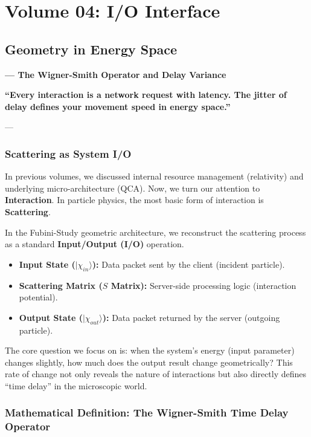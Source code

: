 \documentclass[11pt,a4paper,twoside]{book}
\begin{document}
 
\part{Volume 04: I/O Interface}

\chapter{Geometry in Energy Space}

\textbf{--- The Wigner-Smith Operator and Delay Variance}

\textbf{``Every interaction is a network request with latency. The jitter of delay defines your movement speed in energy space.''}

---

\section{Scattering as System I/O}

In previous volumes, we discussed internal resource management (relativity) and underlying micro-architecture (QCA). Now, we turn our attention to \textbf{Interaction}. In particle physics, the most basic form of interaction is \textbf{Scattering}.

In the Fubini-Study geometric architecture, we reconstruct the scattering process as a standard \textbf{Input/Output (I/O)} operation.

\begin{itemize}
\item \textbf{Input State ($|\chi_{in}\rangle$):} Data packet sent by the client (incident particle).

\item \textbf{Scattering Matrix ($S$ Matrix):} Server-side processing logic (interaction potential).

\item \textbf{Output State ($|\chi_{out}\rangle$):} Data packet returned by the server (outgoing particle).
\end{itemize}

The core question we focus on is: when the system's energy (input parameter) changes slightly, how much does the output result change geometrically? This rate of change not only reveals the nature of interactions but also directly defines ``time delay'' in the microscopic world.

\section{Mathematical Definition: The Wigner-Smith Time Delay Operator}
\end{document}
